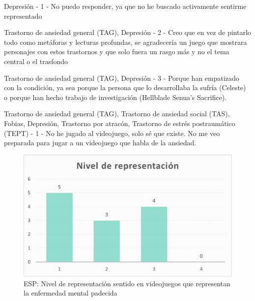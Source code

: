 \documentclass[12pt, a4paper,twoside,titlepage]{book}
\begin{document}
\begin{enumerate}[label=\textbf{\arabic*}.]
    Depresión - 1 - No puedo responder, ya que no he buscado activamente sentirme representado
    
    Trastorno de ansiedad general (TAG), Depresión - 2 - Creo que en vez de pintarlo todo como metáforas y lecturas profundas, se agradecería un juego que mostrara personajes con estos trastornos y que solo fuera un rasgo más y no el tema central o el trasfondo
    
    Trastorno de ansiedad general (TAG), Depresión - 3 - Porque han empatizado con la condición, ya sea porque la persona que lo desarrollaba la sufría (Celeste) o porque han hecho trabajo de investigación (Hellblade Senua's Sacrifice).
    
    Trastorno de ansiedad general (TAG), Trastorno de ansiedad social (TAS), Fobias, Depresión, Trastorno por atracón, Trastorno de estrés postraumático (TEPT) - 1 - No he jugado al videojuego, solo sé que existe. No me veo preparada para jugar a un videojuego que habla de la ansiedad.

\end{enumerate}


\begin{figure}
    \centering
    \includegraphics[width=.8\linewidth]{ANEXO ESP/28AnexESPNivel}
    \caption{ESP: Nivel de representación sentido en videojuegos que representan la enfermedad mental padecida}
    \label{fig:ESPNivel}
\end{figure}
\end{document}
